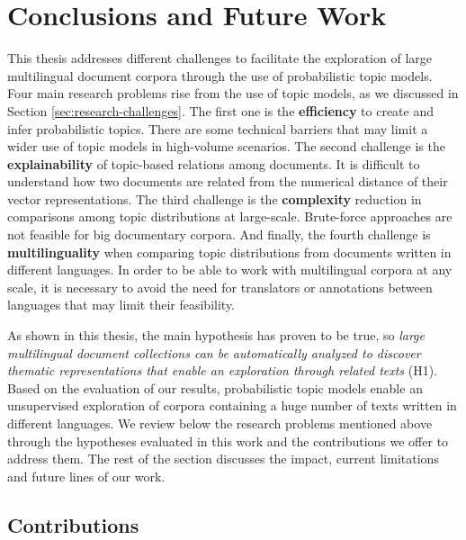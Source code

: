 

\chapter{Conclusions and Future Work}\label{ch:conclusion}

\graphicspath{{conclusions/figures/}}

This thesis addresses different challenges to facilitate the exploration of large multilingual document corpora through the use of probabilistic topic models. Four main research problems rise from the use of topic models, as we discussed in Section \ref{sec:research-challenges}. The first one is the \textbf{efficiency} to create and infer probabilistic topics. There are some technical barriers that may limit a wider use of topic models in high-volume scenarios. The second challenge is the \textbf{explainability} of topic-based relations among documents. It is difficult to understand how two documents are related from the numerical distance of their vector representations. The third challenge is the \textbf{complexity} reduction in comparisons among topic distributions at large-scale. Brute-force approaches are not feasible for big documentary corpora. And finally, the fourth challenge is \textbf{multilinguality} when comparing topic distributions from documents written in different languages. In order to be able to work with multilingual corpora at any scale, it is necessary to avoid the need for translators or annotations between languages that may limit their feasibility.

As shown in this thesis, the main hypothesis has proven to be true, so \textit{large multilingual document collections can be automatically analyzed to discover thematic representations that enable an exploration through related texts} (H1). Based on the evaluation of our results, probabilistic topic models enable an unsupervised exploration of corpora containing a huge number of texts written in different languages. We review below the research problems mentioned above through the hypotheses evaluated in this work and the contributions we offer to address them. The rest of the section discusses the impact, current limitations and future lines of our work. 


\section{Contributions}



